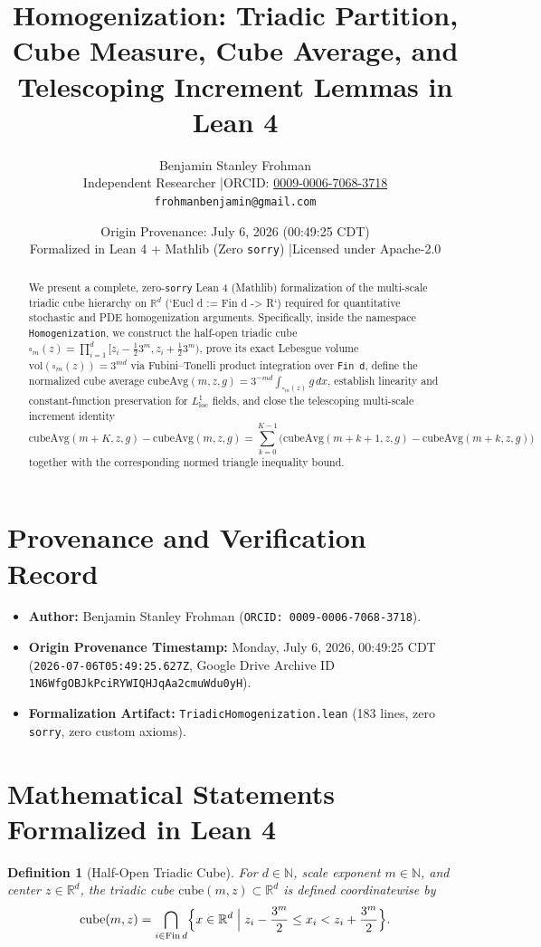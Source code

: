 \documentclass[11pt]{article}
\title{\textbf{Homogenization: Triadic Partition, Cube Measure, Cube Average, and Telescoping Increment Lemmas in Lean 4}}
\author{Benjamin Stanley Frohman\\
\small Independent Researcher \quad|\quad ORCID: \href{https://orcid.org/0009-0006-7068-3718}{0009-0006-7068-3718}\\
\small \texttt{frohmanbenjamin@gmail.com}}
\date{Origin Provenance: July 6, 2026 (00:49:25 CDT) \\ \small Formalized in Lean 4 + Mathlib (Zero \texttt{sorry}) \quad|\quad Licensed under Apache-2.0}
\newtheorem{definition}[theorem]{Definition}
\begin{document}
\maketitle

\begin{abstract}
We present a complete, zero-\texttt{sorry} Lean 4 (Mathlib) formalization of the multi-scale triadic cube hierarchy on $\mathbb{R}^d$ (`Eucl d := Fin d -> R`) required for quantitative stochastic and PDE homogenization arguments. Specifically, inside the namespace \texttt{Homogenization}, we construct the half-open triadic cube $\square_m(z) = \prod_{i=1}^d [z_i - \tfrac{1}{2}3^m, z_i + \tfrac{1}{2}3^m)$, prove its exact Lebesgue volume $\mathrm{vol}(\square_m(z)) = 3^{md}$ via Fubini--Tonelli product integration over \texttt{Fin d}, define the normalized cube average $\mathrm{cubeAvg}(m,z,g) = 3^{-md}\int_{\square_m(z)} g\,dx$, establish linearity and constant-function preservation for $L^1_{\mathrm{loc}}$ fields, and close the telescoping multi-scale increment identity
\[
\mathrm{cubeAvg}(m+K,z,g) - \mathrm{cubeAvg}(m,z,g) = \sum_{k=0}^{K-1} \bigl(\mathrm{cubeAvg}(m+k+1,z,g) - \mathrm{cubeAvg}(m+k,z,g)\bigr)
\]
together with the corresponding normed triangle inequality bound.
\end{abstract}

\section{Provenance and Verification Record}
\begin{itemize}
  \item \textbf{Author:} Benjamin Stanley Frohman (\texttt{ORCID: 0009-0006-7068-3718}).
  \item \textbf{Origin Provenance Timestamp:} Monday, July 6, 2026, 00:49:25 CDT (\texttt{2026-07-06T05:49:25.627Z}, Google Drive Archive ID \texttt{1N6WfgOBJkPciRYWIQHJqAa2cmuWdu0yH}).
  \item \textbf{Formalization Artifact:} \texttt{TriadicHomogenization.lean} (183 lines, zero \texttt{sorry}, zero custom axioms).
\end{itemize}

\section{Mathematical Statements Formalized in Lean 4}

\begin{definition}[Half-Open Triadic Cube]
For $d \in \mathbb{N}$, scale exponent $m \in \mathbb{N}$, and center $z \in \mathbb{R}^d$, the triadic cube $\mathrm{cube}(m,z) \subset \mathbb{R}^d$ is defined coordinatewise by
\[
\mathrm{cube}(m,z) = \bigcap_{i \in \mathrm{Fin}\,d} \Bigl\{ x \in \mathbb{R}^d \;\Big|\; z_i - \frac{3^m}{2} \le x_i < z_i + \frac{3^m}{2} \Bigr\}.
\]
\end{definition}
\end{document}
